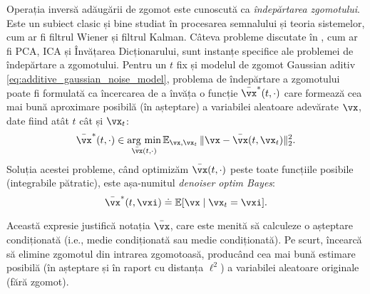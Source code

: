 \documentclass[../../book-main_ro.tex]{subfiles}
\begin{document}
Operația inversă adăugării de zgomot este cunoscută ca \textit{îndepărtarea zgomotului}. Este un subiect clasic și bine studiat în procesarea semnalului și teoria sistemelor, cum ar fi filtrul Wiener și filtrul Kalman. Câteva probleme discutate în , cum ar fi PCA, ICA și Învățarea Dicționarului, sunt instanțe specifice ale problemei de îndepărtare a zgomotului. Pentru un \(t\) fix și modelul de zgomot Gaussian aditiv \eqref{eq:additive_gaussian_noise_model}, problema de îndepărtare a zgomotului poate fi formulată ca încercarea de a învăța o funcție \(\bar{\vx}^{\ast}(t, \cdot)\) care formează cea mai bună aproximare posibilă (în așteptare) a variabilei aleatoare adevărate \(\vx\), date fiind atât \(t\) cât și \(\vx_{t}\):
\begin{equation}\label{eq:denoising_loss}
	\bar{\vx}^{\ast}(t, \cdot) \in \argmin_{\bar{\vx}(t, \cdot)}\Ex_{\vx, \vx_{t}}\norm{\vx - \bar{\vx}(t, \vx_{t})}_{2}^{2}.
\end{equation}
Soluția acestei probleme, când optimizăm \(\bar{\vx}(t, \cdot)\) peste toate funcțiile posibile (integrabile pătratic), este așa-numitul \textit{denoiser optim Bayes}: 
\begin{equation}\label{eq:optimal_denoiser}
	\bar{\vx}^{\ast}(t, \vxi) \doteq \Ex[\vx \mid \vx_{t} = \vxi].
\end{equation}

Această expresie justifică notația \(\bar{\vx}\), care este menită să calculeze o așteptare condiționată (i.e., medie condiționată sau medie condiționată). Pe scurt, încearcă să elimine zgomotul din intrarea zgomotoasă, producând cea mai bună estimare posibilă (în așteptare și în raport cu distanța \(\ell^{2}\)) a variabilei aleatoare originale (fără zgomot).
\end{document}
